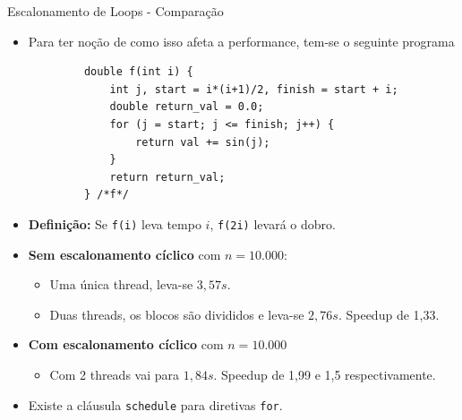 	\begin{frame}[fragile]{Escalonamento de Loops - Comparação}
		\begin{itemize}
			\item Para ter noção de como isso afeta a performance, tem-se o seguinte programa
		\end{itemize}
		\begin{verbatim}
			double f(int i) {
				int j, start = i*(i+1)/2, finish = start + i;
				double return_val = 0.0;
				for (j = start; j <= finish; j++) {
					return val += sin(j);
				}
				return return_val; 
			} /*f*/
		\end{verbatim}
		\begin{itemize}
			\item \textbf{Definição:} Se {\tt f(i)} leva tempo $i$, {\tt f(2i)} levará o dobro.
			\item \textbf{Sem escalonamento cíclico} com $n=10.000$:
			\begin{itemize}
				\item Uma única thread, leva-se $3,57s$.
				\item Duas threads, os blocos são divididos e leva-se $2,76s$. Speedup de 1,33.
			\end{itemize}
			\item \textbf{Com escalonamento cíclico} com $n=10.000$
			\begin{itemize}
				\item Com 2 threads vai para $1,84s$. Speedup de 1,99 e 1,5 respectivamente.
			\end{itemize}
			\item Existe a cláusula {\tt schedule} para diretivas {\tt for}.
		\end{itemize}
\end{frame}

